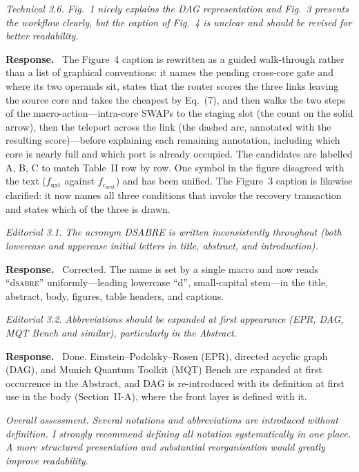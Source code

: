\documentclass[11pt]{article}
\newcommand{\dSABRE}{d\textsc{sabre}}
\newenvironment{comment}{\medskip\noindent\itshape}{\par}
\newcommand{\response}{\smallskip\noindent\textbf{Response.}\ }
\begin{document}
\begin{comment}
Technical 3.6. Fig.~1 nicely explains the DAG representation and Fig.~3
presents the workflow clearly, but the caption of Fig.~4 is unclear and should
be revised for better readability.
\end{comment}

\response
The Figure~4 caption is rewritten as a guided walk-through rather than a list
of graphical conventions: it names the pending cross-core gate and where its
two operands sit, states that the router scores the three links leaving the
source core and takes the cheapest by Eq.~(7), and then walks the two steps of
the macro-action---intra-core SWAPs to the staging slot (the count on the
solid arrow), then the teleport across the link (the dashed arc, annotated
with the resulting score)---before explaining each remaining annotation,
including which core is nearly full and which port is already occupied. The
candidates are labelled A, B, C to match Table~II row by row. One symbol in
the figure disagreed with the text ($f_{\mathrm{nxt}}$ against
$f_{c_{\mathrm{next}}}$) and has been unified. The Figure~3 caption is
likewise clarified: it now names all three conditions that invoke the recovery
transaction and states which of the three is drawn.

\begin{comment}
Editorial 3.1. The acronym DSABRE is written inconsistently throughout (both
lowercase and uppercase initial letters in title, abstract, and introduction).
\end{comment}

\response
Corrected. The name is set by a single macro and now reads ``\dSABRE{}''
uniformly---leading lowercase ``d'', small-capital stem---in the title,
abstract, body, figures, table headers, and captions.

\begin{comment}
Editorial 3.2. Abbreviations should be expanded at first appearance (EPR, DAG,
MQT Bench and similar), particularly in the Abstract.
\end{comment}

\response
Done. Einstein--Podolsky--Rosen (EPR), directed acyclic graph (DAG), and
Munich Quantum Toolkit (MQT) Bench are expanded at first occurrence in the
Abstract, and DAG is re-introduced with its definition at first use in the
body (Section~II-A), where the front layer is defined with it.

\begin{comment}
Overall assessment. Several notations and abbreviations are introduced without
definition. I strongly recommend defining all notation systematically in one
place. A more structured presentation and substantial reorganisation would
greatly improve readability.
\end{comment}
\end{document}
